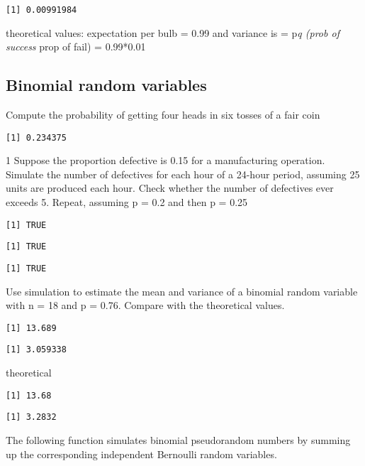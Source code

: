\documentclass[
  letterpaper,
  DIV=11,
  numbers=noendperiod]{scrreprt}
\begin{document}
\begin{verbatim}
[1] 0.00991984
\end{verbatim}

theoretical values: expectation per bulb = 0.99 and variance is =
p\emph{q (prob of success } prop of fail) = 0.99*0.01

\subsection{Binomial random variables}\label{binomial-random-variables}

Compute the probability of getting four heads in six tosses of a fair
coin

\begin{verbatim}
[1] 0.234375
\end{verbatim}

1 Suppose the proportion defective is 0.15 for a manufacturing
operation. Simulate the number of defectives for each hour of a 24-hour
period, assuming 25 units are produced each hour. Check whether the
number of defectives ever exceeds 5. Repeat, assuming p = 0.2 and then p
= 0.25

\begin{verbatim}
[1] TRUE
\end{verbatim}

\begin{verbatim}
[1] TRUE
\end{verbatim}

\begin{verbatim}
[1] TRUE
\end{verbatim}

Use simulation to estimate the mean and variance of a binomial random
variable with n = 18 and p = 0.76. Compare with the theoretical values.

\begin{verbatim}
[1] 13.689
\end{verbatim}

\begin{verbatim}
[1] 3.059338
\end{verbatim}

theoretical

\begin{verbatim}
[1] 13.68
\end{verbatim}

\begin{verbatim}
[1] 3.2832
\end{verbatim}

The following function simulates binomial pseudorandom numbers by
summing up the corresponding independent Bernoulli random variables.
\end{document}
